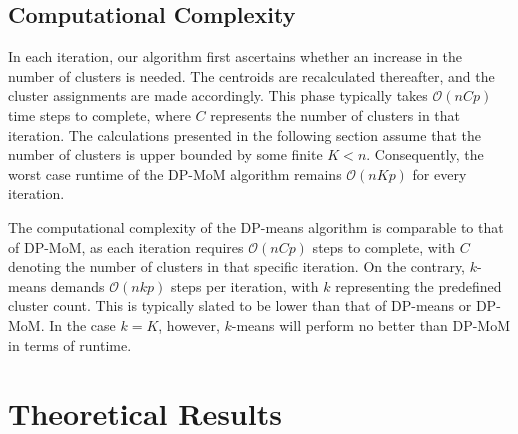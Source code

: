 \documentclass{article}
\newcommand{\bX}{\boldsymbol{X}}
\newtheorem{assumption}{A\hspace{-2pt}}
\begin{document}
\subsection{Computational Complexity}
In each iteration, our algorithm first ascertains whether an increase in the number of clusters is needed. The centroids are recalculated thereafter, and the cluster assignments are made accordingly. This phase typically takes $\mathcal{O}(nCp)$ time steps to complete, where $C$ represents the number of clusters in that iteration. The calculations presented in the following section assume that the number of clusters is upper bounded by some finite $K<n$. Consequently, the worst case runtime of the DP-MoM algorithm remains $\mathcal{O}(nKp)$ for every iteration.

The computational complexity of the DP-means algorithm is comparable to that of DP-MoM, as each iteration requires $\mathcal{O}(nCp)$ steps to complete, with $C$ denoting the number of clusters in that specific iteration. On the contrary, $k$-means demands $\mathcal{O}(nkp)$ steps per iteration, with $k$ representing the predefined cluster count. This is typically slated to be lower than that of DP-means or DP-MoM. In the case $k=K$, however, $k$-means will perform no better than DP-MoM in terms of runtime.


\section{Theoretical Results}
\label{sec:theory}




\end{document}
